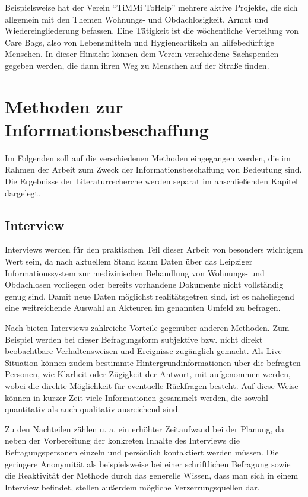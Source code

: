 Beispielsweise hat der Verein \enquote{TiMMi ToHelp} mehrere aktive Projekte, die sich allgemein mit den Themen Wohnungs- und Obdachlosigkeit, Armut und Wiedereingliederung befassen. Eine Tätigkeit ist die wöchentliche Verteilung von Care Bags, also von Lebensmitteln und Hygieneartikeln  an hilfebedürftige Menschen. In dieser Hinsicht können dem Verein verschiedene Sachspenden gegeben werden, die dann ihren Weg zu Menschen auf der Straße finden. \citep{TiMMi}


\section{Methoden zur Informationsbeschaffung}\label{sec:methods}

Im Folgenden soll auf die verschiedenen Methoden eingegangen werden, die im Rahmen der Arbeit zum Zweck der Informationsbeschaffung von Bedeutung sind. Die Ergebnisse der Literaturrecherche werden separat im anschließenden Kapitel dargelegt.

\subsection{Interview}

Interviews werden für den praktischen Teil dieser Arbeit von besonders wichtigem Wert sein, da nach aktuellem Stand kaum Daten über das Leipziger Informationssystem zur medizinischen Behandlung von Wohnungs- und Obdachlosen vorliegen oder bereits vorhandene Dokumente nicht vollständig genug sind. Damit neue Daten möglichst realitätsgetreu sind, ist es naheliegend eine weitreichende Auswahl an Akteuren im genannten Umfeld zu befragen.

Nach \citet{Doering.2015} bieten Interviews zahlreiche Vorteile gegenüber anderen Methoden. Zum Beispiel werden bei dieser Befragungsform subjektive bzw. nicht direkt beobachtbare Verhaltensweisen und Ereignisse zugänglich gemacht. Als Live-Situation können zudem bestimmte Hintergrundinformationen über die befragten Personen, wie Klarheit oder Zügigkeit der Antwort, mit aufgenommen werden, wobei die direkte Möglichkeit für eventuelle Rückfragen besteht. Auf diese Weise können in kurzer Zeit viele Informationen gesammelt werden, die sowohl quantitativ als auch qualitativ ausreichend sind.

Zu den Nachteilen zählen u. a. ein erhöhter Zeitaufwand bei der Planung, da neben der Vorbereitung der konkreten Inhalte des Interviews die Befragungspersonen einzeln und persönlich kontaktiert werden müssen. Die geringere Anonymität als beispielsweise bei einer schriftlichen Befragung sowie die Reaktivität der Methode durch das generelle Wissen, dass man sich in einem Interview befindet, stellen außerdem mögliche Verzerrungsquellen dar.

